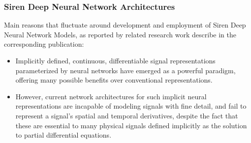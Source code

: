 



\begin{frame}
\frametitle{Siren Deep Neural Network Architectures}
Main reasons that fluctuate around development and employment  of Siren Deep Neural Network Models, as reported by related research work describe in the corresponding publication:
\begin{itemize}
\item Implicitly defined, continuous, differentiable signal representations parameterized by neural networks have emerged as a powerful paradigm, offering many possible 
benefits over conventional representations.
\item  However, current network architectures for such implicit neural representations are incapable of modeling signals with fine detail, and fail to represent
a signal’s spatial and temporal derivatives, despite the fact that these are essential to many physical signals defined implicitly as the solution to partial differential equations.
\end{itemize}
\end{frame}